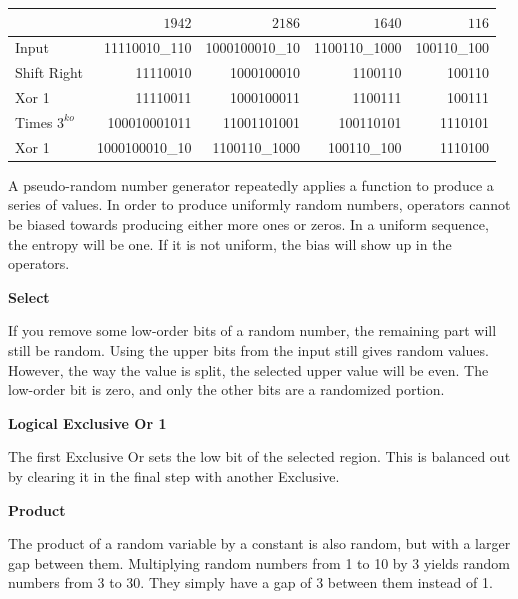 \documentclass[letterpaper]{article}
\begin{document}
\begin{multicols}{2}
    \noindent
    \begin{minipage}{\columnwidth}
        \setlength{\tabcolsep}{.35\tabcolsep}
        \centering
        \begin{tabular}{|l|r|r|r|r|}
            \hline
                           & \textbf{$1942$} & \textbf{$2186$} & \textbf{$1640$} & \textbf{$116$} \\
            \hline
            Input          & 11110010\_110   & 1000100010\_10  & 1100110\_1000   & 100110\_100    \\
            \hline
            Shift Right    & 11110010        & 1000100010      & 1100110         & 100110         \\
            \hline
            Xor 1          & 11110011        & 1000100011      & 1100111         & 100111         \\
            \hline
            Times $3^{ko}$ & 100010001011    & 11001101001     & 100110101       & 1110101        \\
            \hline
            Xor 1          & 1000100010\_10  & 1100110\_1000   & 100110\_100     & 1110100        \\
            \hline
        \end{tabular}
    \end{minipage}

    A pseudo-random number generator repeatedly applies a function to produce a series of values. In order to produce uniformly random numbers, operators cannot be biased towards producing either more ones or zeros. In a uniform sequence, the entropy will be one. If it is not uniform, the bias will show up in the operators.

    \textbf{Select}

    If you remove some low-order bits of a random number, the remaining part will still be random. Using the upper bits from the input still gives random values. However, the way the value is split, the selected upper value will be even. The low-order bit is zero, and only the other bits are a randomized portion.

    \textbf{Logical Exclusive Or 1}

    The first Exclusive Or sets the low bit of the selected region. This is balanced out by clearing it in the final step with another Exclusive.

    \textbf{Product}

    The product of a random variable by a constant is also random, but with a larger gap between them. Multiplying random numbers from 1 to 10 by 3 yields random numbers from 3 to 30. They simply have a gap of 3 between them instead of 1.


\end{multicols}
\end{document}
